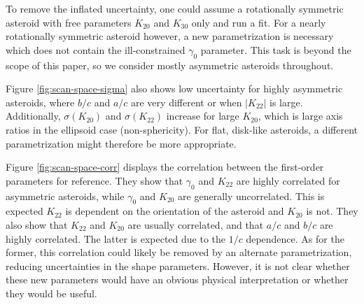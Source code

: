 \documentclass[fleqn,usenatbib]{mnras}
\begin{document}
To remove the inflated uncertainty, one could assume a rotationally symmetric asteroid with free parameters $K_{20}$ and $K_{30}$ only and run a fit. For a nearly rotationally symmetric asteroid however, a new parametrization is necessary which does not contain the ill-constrained $\gamma_0$ parameter. This task is beyond the scope of this paper, so we consider mostly asymmetric asteroids throughout.

Figure \ref{fig:scan-space-sigma} also shows low uncertainty for highly asymmetric asteroids, where $b/c$ and $a/c$ are very different or when $|K_{22}|$ is large. Additionally, $\sigma(K_{20})$ and $\sigma(K_{22})$ increase for large $K_{20}$, which is large axis ratios in the ellipsoid case (non-sphericity). For flat, disk-like asteroids, a different parametrization might therefore be more appropriate.

Figure \ref{fig:scan-space-corr} displays the correlation between the first-order parameters for reference. They show that $\gamma_0$ and $K_{22}$ are highly correlated for asymmetric asteroids, while $\gamma_0$ and $K_{20}$ are generally uncorrelated. This is expected $K_{22}$ is dependent on the orientation of the asteroid and $K_{20}$ is not. They also show that $K_{22}$ and $K_{20}$ are usually correlated, and that $a/c$ and $b/c$ are highly correlated. The latter is expected due to the $1/c$ dependence. As for the former, this correlation could likely be removed by an alternate parametrization, reducing uncertainties in the shape parameters. However, it is not clear whether these new parameters would have an obvious physical interpretation or whether they would be useful.
\end{document}

